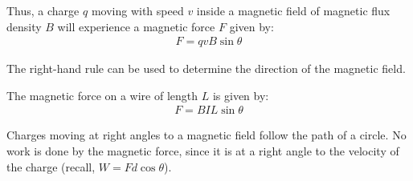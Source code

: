 Thus, a charge $q$ moving with speed $v$ inside a magnetic field of magnetic
flux density $B$ will experience a magnetic force $F$ given by:
\begin{align*}
    F = qvB\sin\theta
\end{align*}

The right-hand rule can be used to determine the direction of the magnetic
field.

The magnetic force on a wire of length $L$ is given by:
\begin{align*}
    F = BIL\sin\theta
\end{align*}

Charges moving at right angles to a magnetic field follow the path of a
circle. No work is done by the magnetic force, since it is at a right angle to
the velocity of the charge (recall, $W = Fd\cos\theta$).



